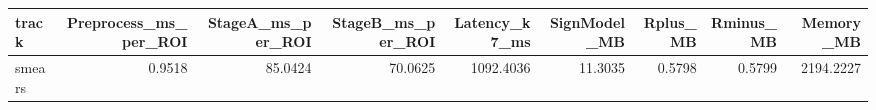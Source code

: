 \begin{tabular}{lrrrrrrrr}
\toprule
track & Preprocess_ms_per_ROI & StageA_ms_per_ROI & StageB_ms_per_ROI & Latency_k7_ms & SignModel_MB & Rplus_MB & Rminus_MB & Memory_MB \\
\midrule
smears & 0.9518 & 85.0424 & 70.0625 & 1092.4036 & 11.3035 & 0.5798 & 0.5799 & 2194.2227 \\
\bottomrule
\end{tabular}
